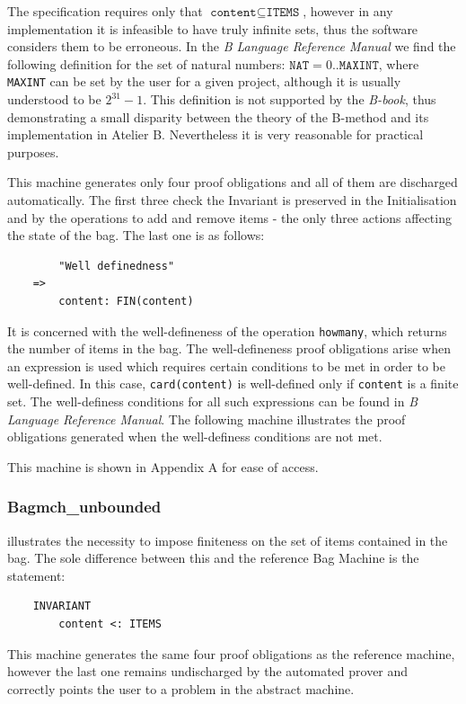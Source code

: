 \documentclass[12pt,journal,duplex]{IEEEtran}
\begin{document}
	The specification requires only that $\texttt{content} \subseteq \texttt{ITEMS}$, however in any implementation it is infeasible to have truly infinite sets, thus the software considers them to be erroneous. In the \emph{B Language Reference Manual}\cite{b reference} we find the following definition for the set of natural numbers: ${\texttt{NAT}  = 0 .. \texttt{MAXINT}}$, where \texttt{MAXINT} can be set by the user for a given project, although it is usually understood to be $2^{31}-1$. This definition is not supported by the \emph{B-book}, thus demonstrating a small disparity between the theory of the B-method and its implementation in Atelier B. Nevertheless it is very reasonable for practical purposes.

	This machine generates only four proof obligations and all of them are discharged automatically. The first three check the Invariant is preserved in the Initialisation and by the operations to add and remove items - the only three actions affecting the state of the bag. The last one is as follows:

	\begin{lstlisting}
		"Well definedness"
	=>
		content: FIN(content)
	\end{lstlisting}

	It is concerned with the well-defineness of the operation \texttt{howmany}, which returns the number of items in the bag. The well-defineness proof obligations arise when an expression is used which requires certain conditions to be met in order to be well-defined. In this case, \texttt{card(content)} is well-defined only if \texttt{content} is a finite set. The well-definess conditions for all such expressions can be found in \emph{B Language Reference Manual}\cite{b reference}. The following machine illustrates the proof obligations generated when the well-definess conditions are not met.

	This machine is shown in Appendix A for ease of access.

	\subsubsection{Bagmch\_unbounded} illustrates the necessity to impose finiteness on the set of items contained in the bag. The sole difference between this and the reference Bag Machine is the statement:

	\begin{lstlisting}
	INVARIANT
		content <: ITEMS
	\end{lstlisting}
	This machine generates the same four proof obligations as the reference machine, however the last one remains undischarged by the automated prover and correctly points the user to a problem in the abstract machine.
\end{document}
